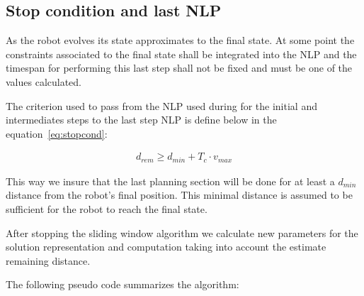 \documentclass[eprint]{actapoly}
\begin{document}
\subsection{Stop condition and last NLP}


As the robot evolves its state approximates to the final state. 
At some point the constraints associated to the final state shall be integrated into the NLP and the timespan for performing this last
step shall not be fixed and must be one of the values calculated.

The criterion used to pass from the NLP used during for the initial and intermediates steps to the last step NLP 
is define below in the equation~\ref{eq:stopcond}:

\begin{align}
  d_{rem} \geq d_{min} + T_c \cdot v_{max}
\end{align}

This way we insure that the last planning section will be done for at least a $d_{min}$ distance from the robot's final position.
This minimal distance is assumed to be sufficient for the robot to reach the final state.

After stopping the sliding window algorithm we calculate new parameters for the solution representation and computation taking into
account the estimate remaining distance.

The following pseudo code summarizes the algorithm: 
\end{document}
